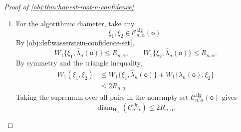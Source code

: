 \begin{proof}[Proof of \cref{obj:thm:honest-root-n-confidence}]
\begin{enumerate}
\item For the algorithmic diameter, take any
\[
\xi_1,\xi_2\in\mathcal C^{\mathrm{alg}}_{n,\alpha}(\mathsf o).
\]
By \cref{obj:def:wasserstein-confidence-set},
\[
W_1\{\xi_1,\widehat\lambda_n(\mathsf o)\}\le R_{n,\alpha},
\qquad
W_1\{\xi_2,\widehat\lambda_n(\mathsf o)\}\le R_{n,\alpha}.
\]
By symmetry and the triangle inequality,
\[
\begin{aligned}
W_1(\xi_1,\xi_2)
&\le
W_1\{\xi_1,\widehat\lambda_n(\mathsf o)\}
+
W_1\{\widehat\lambda_n(\mathsf o),\xi_2\}  \\
&\le2R_{n,\alpha}.
\end{aligned}
\]
Taking the supremum over all pairs in the nonempty set \(\mathcal C^{\mathrm{alg}}_{n,\alpha}(\mathsf o)\) gives
\[
\operatorname{diam}_{W_1}(\mathcal C^{\mathrm{alg}}_{n,\alpha})
\le
2R_{n,\alpha}.
\]
\end{enumerate}
\end{proof}

